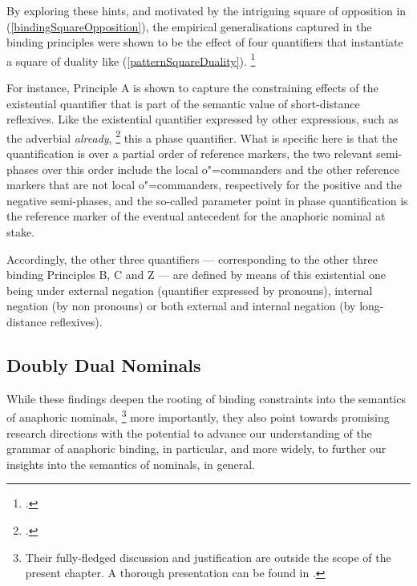 \documentclass[output=paper
,modfonts
,nonflat]{langsci/langscibook}
\begin{document}
By exploring these hints, and motivated by the intriguing square of opposition in (\ref{bindingSquareOpposition}), 
the empirical generalisations captured in the binding principles were shown to be the effect 
of four quantifiers that instantiate a square of duality like (\ref{patternSquareDuality}).%
\footnote{
\citep{branco:1998,branco:2001,branco:2005,branco:2006}.
}


For instance, Principle A is shown to capture the constraining effects of the existential quantifier 
that is part of the semantic value of short-distance reflexives. Like the existential
quantifier expressed by other expressions, such as the adverbial {\em already},%
\footnote{
\citep{Lobner1987}.
}
this a phase quantifier. What is specific here is that the quantification is over
a partial order of reference markers,  the two relevant semi-phases over this order
include the local o"=commanders and the other reference markers that are not
local o"=commanders, respectively for the positive and the negative semi-phases,
and the so-called parameter point in phase quantification is the reference
marker of the eventual antecedent for the anaphoric nominal at stake.

Accordingly, the other
three quantifiers --- corresponding to the other three binding Principles B, C and Z --- 
are defined by means of this existential one being under external negation (quantifier expressed by pronouns), 
internal negation (by non pronouns) or both external and internal negation (by long-distance reflexives).



\subsection{Doubly Dual Nominals \label{dualNominals}}

While these findings deepen the rooting of binding constraints into the semantics of anaphoric nominals,%
\footnote{
Their fully-fledged discussion and justification are outside the scope of the present chapter. A thorough presentation can be found in \citep{branco:2005}.} more importantly, they also point towards promising research directions
with the potential to advance our understanding of the grammar of anaphoric binding, in particular, 
and more widely, to further our insights into the semantics of nominals, in general.
\end{document}
